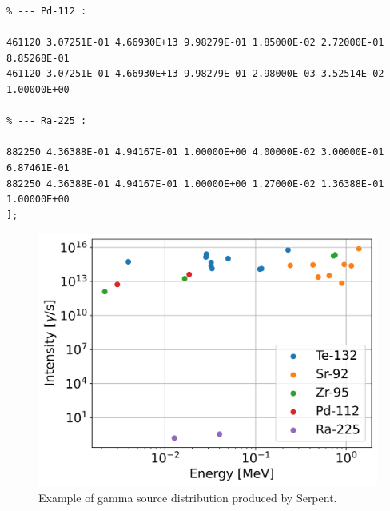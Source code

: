 \begin{lstlisting}
% --- Pd-112 :

461120 3.07251E-01 4.66930E+13 9.98279E-01 1.85000E-02 2.72000E-01 8.85268E-01
461120 3.07251E-01 4.66930E+13 9.98279E-01 2.98000E-03 3.52514E-02 1.00000E+00

% --- Ra-225 :

882250 4.36388E-01 4.94167E-01 1.00000E+00 4.00000E-02 3.00000E-01 6.87461E-01
882250 4.36388E-01 4.94167E-01 1.00000E+00 1.27000E-02 1.36388E-01 1.00000E+00
];
\end{lstlisting}

\begin{figure}[htbp!] %
  \centering
  \includegraphics[width=0.75\linewidth]{figures/example_gsrc}
  \caption{Example of gamma source distribution produced by Serpent.}
  \label{fig:example_gsrc}
\end{figure}
